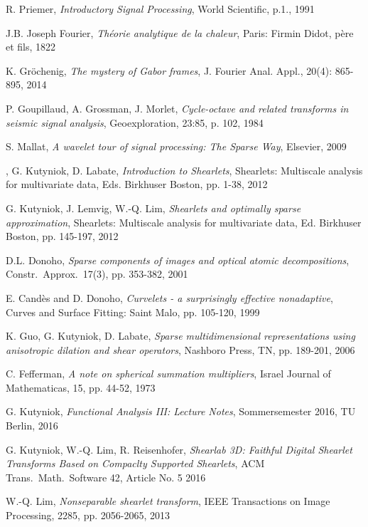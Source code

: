 \documentclass[11pt, english, singlespacing, headsepline, ]{MastersDoctoralThesis}
\theoremstyle{definition}
\begin{document}
\begin{thebibliography}{90}
	R. Priemer,
	\emph{Introductory Signal Processing},
	World Scientific, p.1.,
	1991

	J.B. Joseph Fourier,
	\emph{Théorie analytique de la chaleur},
	Paris: Firmin Didot, père et fils, 
	1822

	K. Gr\"ochenig,
	\emph{The mystery of Gabor frames},
	J. Fourier Anal. Appl., 20(4): 865-895,
	2014	

	P. Goupillaud, A. Grossman, J. Morlet,
	\emph{Cycle-octave and related transforms in seismic signal analysis},
	Geoexploration, 23:85, p. 102,
	1984

	S. Mallat,
	\emph{A wavelet tour of signal processing: The Sparse Way},
	Elsevier, 
	2009

,
	G. Kutyniok, D. Labate,
	\emph{Introduction to Shearlets},
	Shearlets: Multiscale analysis for multivariate data, Eds. Birkhuser Boston, pp. 1-38,
	2012

	G. Kutyniok, J. Lemvig, W.-Q. Lim,
	\emph{Shearlets and optimally sparse approximation},
	Shearlets: Multiscale analysis for multivariate data, Ed. Birkhuser Boston, pp. 145-197,
	2012

	D.L. Donoho,
	\emph{Sparse components of images and optical atomic decompositions},
	Constr.\ Approx.\, 17(3), pp. 353-382,
	2001

	E. Candès and D. Donoho,
	\emph{Curvelets - a surprisingly effective nonadaptive},
	Curves and Surface Fitting: Saint Malo, pp. 105-120,
	1999

	K. Guo, G. Kutyniok, D. Labate,
	\emph{Sparse multidimensional representations using anisotropic dilation and shear operators},
	Nashboro Press, TN, pp. 189-201,
	2006
	
	C. Fefferman, 
	\emph{A note on spherical summation multipliers},
	Israel Journal of Mathematicas, 15, pp. 44-52,
	1973

	G. Kutyniok,
	\emph{Functional Analysis III: Lecture Notes},
	Sommersemester 2016, TU Berlin, 
	2016

	G. Kutyniok, W.-Q. Lim, R. Reisenhofer,
	\emph{Shearlab 3D: Faithful Digital Shearlet Transforms Based on Compaclty Supported Shearlets},
	ACM Trans.\ Math.\ Software 42, Article No. 5
	2016

	W.-Q. Lim,
	\emph{Nonseparable shearlet transform},
	IEEE Transactions on Image Processing, 2285, pp. 2056-2065,
	2013


\end{thebibliography}
\end{document}
